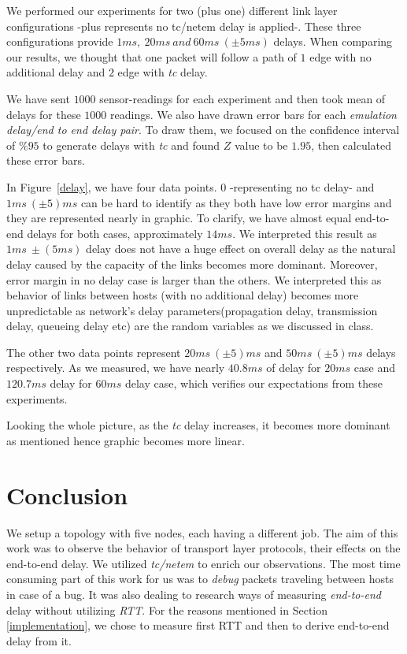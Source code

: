 \documentclass[conference]{IEEEtran}
\begin{document}
\par We performed our experiments for two (plus one) different link layer configurations -plus represents no tc/netem delay is applied-. These three configurations provide $1ms,\ 20ms\ and\ 60ms\ (\pm5ms)$ delays. When comparing our results, we thought that one packet will follow a path of $1$ edge with no additional delay and $2$ edge with \textit{tc} delay. 

\par We have sent $1000$ sensor-readings for each experiment and then took mean of delays for these $1000$ readings. We also have drawn error bars for each \textit{emulation delay/end to end delay pair}. To draw them, we focused on the confidence interval of $\% 95$ to generate delays with \textit{tc} and found $Z$ value to be $1.95$, then calculated these error bars.

\par In  Figure~\ref{delay}, we have four data points. $0$ -representing no tc delay- and $1ms\ (\pm5)ms$ can be hard to identify as they both have low error margins and they are represented nearly in graphic. To clarify, we have almost equal end-to-end delays for both cases, approximately $14ms$. We interpreted this result as $1ms\ \pm(5ms)$ delay does not have a huge effect on overall delay as the natural delay caused by the capacity of the links becomes more dominant. Moreover, error margin in no delay case is larger than the others. We interpreted this as behavior of links between hosts (with no additional delay) becomes more unpredictable as network's delay parameters(propagation delay, transmission delay, queueing delay etc) are the random variables as we discussed in class.

\par The other two data points represent $20ms\ (\pm5)ms$  and $50ms\ (\pm5)ms$ delays respectively. As we measured, we have nearly $40.8ms$ of delay for $20ms$ case and $120.7ms$ delay for $60ms$ delay case, which verifies our expectations from these experiments.

\par Looking the whole picture, as the \textit{tc} delay increases, it becomes more dominant as mentioned hence graphic becomes more linear.

\section{Conclusion}

\par We setup a topology with five nodes, each having a different job. The aim of this work was to observe the behavior of transport layer protocols, their effects on the end-to-end delay. We utilized \textit{tc/netem} to enrich our observations. The most time consuming part of this work for us was to \textit{debug} packets traveling between hosts in case of a bug. It was also dealing to research ways of measuring \textit{end-to-end} delay without utilizing \textit{RTT}. For the reasons mentioned in Section \ref{implementation}, we chose to measure first RTT and then to derive end-to-end delay from it.
\end{document}
